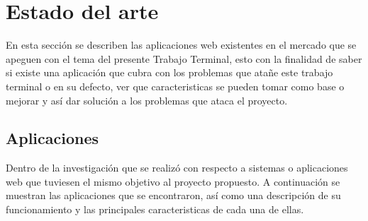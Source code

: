 \chapter{Estado del arte}


\noindent En esta sección se describen las aplicaciones web existentes en el mercado que se apeguen con el tema del presente Trabajo Terminal, esto con la finalidad de saber si existe una aplicación que cubra con los problemas que atañe este trabajo terminal o en su defecto, ver que caracteristicas se pueden tomar como base o mejorar y así dar solución a los problemas que ataca el proyecto. 




\section{Aplicaciones}
\noindent Dentro de la investigación que se realizó con respecto a sistemas o aplicaciones web que tuviesen el mismo objetivo al proyecto propuesto. A continuación se muestran las aplicaciones que se encontraron, así como una descripción de su funcionamiento y las principales caracteristicas de cada una de ellas.
